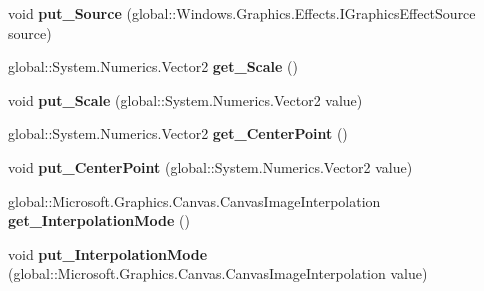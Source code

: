 \begin{DoxyCompactItemize}
void {\bfseries put\+\_\+\+Source} (global\+::\+Windows.\+Graphics.\+Effects.\+I\+Graphics\+Effect\+Source source)
\item 
\mbox{\label{interface_microsoft_1_1_graphics_1_1_canvas_1_1_effects_1_1_i_scale_effect_afae9f41434e94bb89958e555bf403b47}} 
global\+::\+System.\+Numerics.\+Vector2 {\bfseries get\+\_\+\+Scale} ()
\item 
\mbox{\label{interface_microsoft_1_1_graphics_1_1_canvas_1_1_effects_1_1_i_scale_effect_a2945fd65d3f7df0e167dd527632d4244}} 
void {\bfseries put\+\_\+\+Scale} (global\+::\+System.\+Numerics.\+Vector2 value)
\item 
\mbox{\label{interface_microsoft_1_1_graphics_1_1_canvas_1_1_effects_1_1_i_scale_effect_abaa43e3b0b5b6f89987efd1e0930c4fa}} 
global\+::\+System.\+Numerics.\+Vector2 {\bfseries get\+\_\+\+Center\+Point} ()
\item 
\mbox{\label{interface_microsoft_1_1_graphics_1_1_canvas_1_1_effects_1_1_i_scale_effect_ae77c17d958bfacfc7652816c2fc67522}} 
void {\bfseries put\+\_\+\+Center\+Point} (global\+::\+System.\+Numerics.\+Vector2 value)
\item 
\mbox{\label{interface_microsoft_1_1_graphics_1_1_canvas_1_1_effects_1_1_i_scale_effect_a4fe4bd90b0fa1dfcf5e3831f15e73a81}} 
global\+::\+Microsoft.\+Graphics.\+Canvas.\+Canvas\+Image\+Interpolation {\bfseries get\+\_\+\+Interpolation\+Mode} ()
\item 
\mbox{\label{interface_microsoft_1_1_graphics_1_1_canvas_1_1_effects_1_1_i_scale_effect_aaaff922db5597526bd069b5b3cfa1bf3}} 
void {\bfseries put\+\_\+\+Interpolation\+Mode} (global\+::\+Microsoft.\+Graphics.\+Canvas.\+Canvas\+Image\+Interpolation value)
\item 
\mbox{\label{interface_microsoft_1_1_graphics_1_1_canvas_1_1_effects_1_1_i_scale_effect_ac46828996e589095068e0beff4165185}} 

\end{DoxyCompactItemize}

